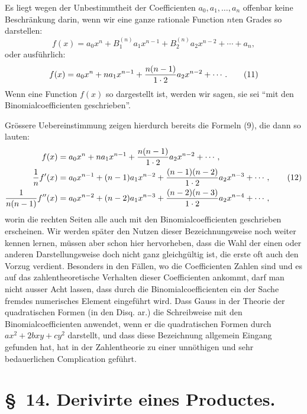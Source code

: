\documentclass[11pt]{article}
\begin{document}
Es liegt wegen der Unbestimmtheit der Coefficienten $a_0,a_1,\ldots,a_n$ offenbar keine Beschränkung darin, wenn wir eine ganze rationale Function $n$ten Grades so darstellen:
\begin{equation}
 f(x)=a_0x^n+B_1^{(n)}a_1x^{n-1}+B_2^{(n)}a_2x^{n-2}+\cdots+a_n,
\tag{10}
\end{equation}
oder ausführlich:
\begin{equation}
 f(x)=a_0x^n+na_1x^{n-1}+{n(n-1)\over1\cdot2}a_2x^{n-2}+\cdots.
\tag{11}
\end{equation}
Wenn eine Function $f(x)$ so dargestellt ist, werden wir sagen, sie sei ``mit den Binomialcoefficienten geschrieben''.

Grössere Uebereinstimmung zeigen hierdurch bereits die Formeln (9), die dann so lauten:
\begin{align}
 f(x)&=a_0x^n+na_1x^{n-1}+{n(n-1)\over1\cdot2}a_2x^{n-2}+\cdots,\notag\\
 {1\over n}f'(x)&=a_0x^{n-1}+(n-1)a_1x^{n-2}+{(n-1)(n-2)\over1\cdot2}a_2x^{n-3}+\cdots, \tag{12}\\
 {1\over n(n-1)}f''(x)&=a_0x^{n-2}+(n-2)a_1x^{n-3}+{(n-2)(n-3)\over1\cdot2}a_2x^{n-4}+\cdots,\notag
\end{align}
worin die rechten Seiten alle auch mit den Binomialcoefficienten geschrieben erscheinen. Wir werden später den Nutzen dieser Bezeichnungsweise noch weiter kennen lernen, müssen aber schon hier hervorheben, dass die Wahl der einen oder anderen Darstellungsweise doch nicht ganz gleichgültig ist, die erste oft auch den Vorzug verdient. Besonders in den Fällen, wo die Coefficienten Zahlen sind und es auf das zahlentheoretische Verhalten dieser Coefficienten ankommt, darf man nicht ausser Acht lassen, dass durch die Binomialcoefficienten ein der Sache fremdes numerisches Element eingeführt wird. Dass Gauss in der Theorie der quadratischen Formen (in den Disq. ar.) die Schreibweise mit den Binomialcoefficienten anwendet, wenn er die quadratischen Formen durch $ax^2+2bxy+cy^2$ darstellt, und dass diese Bezeichnung allgemein Eingang gefunden hat, hat in der Zahlentheorie zu einer unnöthigen und sehr bedauerlichen Complication geführt.

\section*{\S~14. Derivirte eines Productes.}
\end{document}
